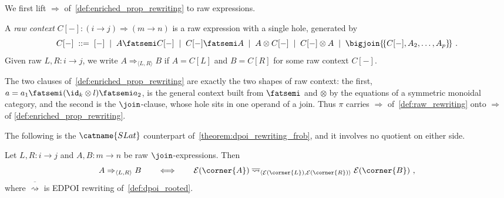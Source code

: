 We first lift $\Rightarrow$ of~\cref{def:enriched_prop_rewriting} to raw expressions.

\begin{definition}\label{def:raw_rewriting}
A \emph{raw context} $C[-] : (i \to j) \Rightarrow (m \to n)$ is a raw expression with a
single hole, generated by
\[
C[-] \;::=\; [-] \;\mid\; A \fatsemi C[-] \;\mid\; C[-] \fatsemi A \;\mid\;
A \otimes C[-] \;\mid\; C[-] \otimes A \;\mid\;
\bigjoin\{\!\{C[-], A_{2}, \ldots, A_{p}\}\!\}~.
\]
Given raw $L, R : i \to j$, we write $A \Rightarrow_{\langle L, R \rangle} B$ if
$A = C[L]$ and $B = C[R]$ for some raw context $C[-]$.
\end{definition}

\begin{remark}
The two clauses of~\cref{def:enriched_prop_rewriting} are exactly the two shapes of raw
context: the first, $a = a_{1} \fatsemi (\id_{k} \otimes l) \fatsemi a_{2}$, is the
general context built from $\fatsemi$ and $\otimes$ by the equations of a symmetric
monoidal category, and the second is the $\join$-clause, whose hole sits in one operand of
a join.
Thus $\pi$ carries $\Rightarrow$ of~\cref{def:raw_rewriting} onto $\Rightarrow$ of
\cref{def:enriched_prop_rewriting}.
\end{remark}

The following is the $\catname{SLat}$ counterpart
of~\cref{theorem:dpoi_rewriting_frob}, and it involves no quotient on either side.

\begin{theorem}\label{theorem:edpoi_raw}
Let $L, R : i \to j$ and $A, B : m \to n$ be raw $\join$-expressions.
Then
\[
A \Rightarrow_{\langle L, R \rangle} B
\qquad\Longleftrightarrow\qquad
\mathcal{E}(\corner{A})
\;\overline{\rightsquigarrow}_{\langle \mathcal{E}(\corner{L}), \mathcal{E}(\corner{R}) \rangle}\;
\mathcal{E}(\corner{B})~,
\]
where $\overline{\rightsquigarrow}$ is EDPOI rewriting of~\cref{def:dpoi_rooted}.
\end{theorem}

